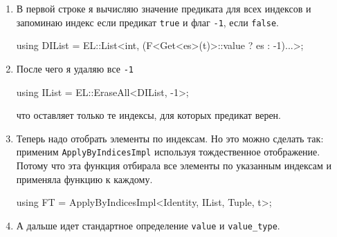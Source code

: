 \begin{enumerate}
\item В первой строке я вычисляю значение предиката для всех индексов и запоминаю индекс если предикат \verb"true" и флаг \verb"-1", если \verb"false".
\begin{cppcode}[\nonumbers]
using DIList = EL::List<int, (F<Get<es>(t)>::value ? es : -1)...>;
\end{cppcode}

\item После чего я удаляю все \verb"-1"
\begin{cppcode}[\nonumbers]
using IList = EL::EraseAll<DIList, -1>;
\end{cppcode}
что оставляет только те индексы, для которых предикат верен.

\item Теперь надо отобрать элементы по индексам.
Но это можно сделать так: применим \verb"ApplyByIndicesImpl" используя тождественное отображение.
Потому что эта функция отбирала все элементы по указанным индексам и применяла функцию к каждому.
\begin{cppcode}[\nonumbers]
using FT = ApplyByIndicesImpl<Identity, IList, Tuple, t>;
\end{cppcode}

\item А дальше идет стандартное определение \verb"value" и \verb"value_type".
\end{enumerate}
